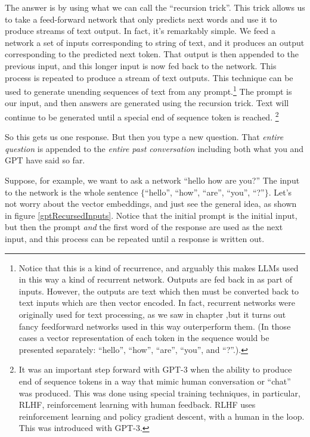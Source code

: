 The answer is by using what we can call the ``recursion trick''.  This trick allows us to take a feed-forward network that only predicts next words and use it to produce streams of text output. In fact, it's remarkably simple. We feed a network a set of inputs corresponding to string of text, and it produces an output corresponding to the predicted next token. That output is then appended to the previous input, and this longer input is now fed back to the network. This process is repeated to produce a stream of text outputs.  This technique can be used to generate unending sequences of text from any prompt.\footnote{Notice that this is a kind of recurrence, and arguably this makes LLMs used in this way a kind of recurrent network. Outputs are fed back in as part of inputs. However, the outputs are text which then must be converted back to text inputs which are then vector encoded.  In fact, recurrent networks were originally used for text processing, as we saw in chapter ,but it turns out fancy feedforward networks used in this way outerperform them.  (In those cases a vector representation of each token in the sequence would be presented separately: ``hello'', ``how'', ``are'', ``you'', and ``?''.).} The prompt is our input, and then answers are generated using the recursion trick. Text will continue to be generated until a special end of sequence token is reached. \footnote{It was an important step forward with GPT-3 when the ability to produce end of sequence tokens in a way that mimic human conversation or ``chat'' was produced. This was done using special training techniques, in particular, RLHF, reinforcement learning with human feedback. RLHF uses reinforcement learning and policy gradient descent, with a human in the loop. This was introduced with GPT-3.} 

So this gets us one response. But then you type a new question. That \emph{entire question} is appended to the \emph{entire past conversation} including both what you and GPT have said so far.  

Suppose, for example, we want to ask a network ``hello how are you?'' The input to the network is the whole sentence $\{$``hello'', ``how'', ``are'', ``you'', ``?''$\}$. Let's  not worry about the vector embeddings, and just see the general idea, as shown in figure \ref{gptRecursedInputs}. Notice that the initial prompt is the initial input, but then the prompt \emph{and} the first word of the response are used as the next input, and this process can be repeated until a response is written out.
  
